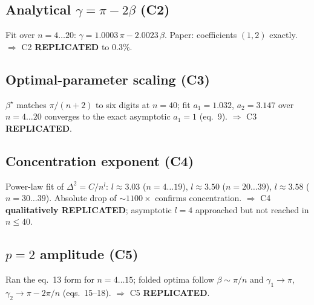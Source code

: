 \documentclass[11pt]{article}
\begin{document}
\subsection{Analytical $\gamma = \pi - 2\beta$ (C2)}
Fit over $n=4\ldots20$: $\gamma = 1.0003\,\pi - 2.0023\,\beta$. Paper: coefficients
$(1, 2)$ exactly. $\Rightarrow$ C2 \textbf{REPLICATED} to 0.3\%.

\subsection{Optimal-parameter scaling (C3)}
$\beta^{\star}$ matches $\pi/(n+2)$ to six digits at $n=40$; fit
$a_{1}=1.032$, $a_{2}=3.147$ over $n=4\ldots20$ converges to the exact
asymptotic $a_{1}=1$ (eq.~9). $\Rightarrow$ C3 \textbf{REPLICATED}.

\subsection{Concentration exponent (C4)}
Power-law fit of $\Delta^{2} = C/n^{l}$:
$l \approx 3.03$ ($n=4\ldots19$), $l \approx 3.50$ ($n=20\ldots39$),
$l \approx 3.58$ ($n=30\ldots39$). Absolute drop of $\sim1100\times$
confirms concentration. $\Rightarrow$ C4 \textbf{qualitatively REPLICATED};
asymptotic $l=4$ approached but not reached in $n\le40$.

\subsection{$p=2$ amplitude (C5)}
Ran the eq.~13 form for $n=4\ldots15$; folded optima follow $\beta \sim \pi/n$
and $\gamma_{1}\to\pi$, $\gamma_{2}\to\pi-2\pi/n$ (eqs.~15--18).
$\Rightarrow$ C5 \textbf{REPLICATED}.
\end{document}
